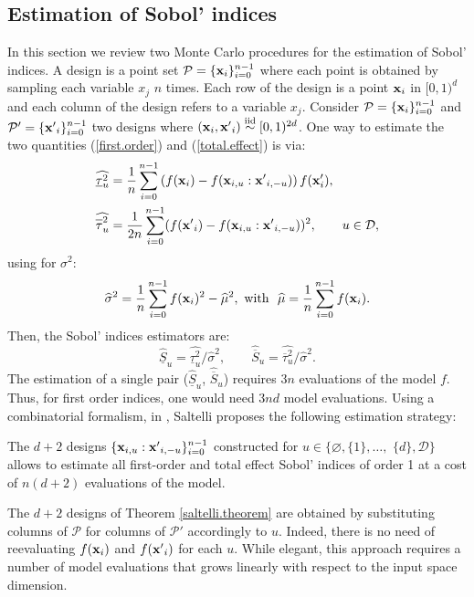 \subsection{Estimation of Sobol' indices}
\label{sec:2.2}
In this section we review two Monte Carlo procedures for the estimation of Sobol' indices. A design is a point set $\mathcal{P}=\{\boldsymbol{\mathbf{x}}_i\}_{i=0}^{n-1}$ where each point is obtained by sampling each variable $x_j$ $n$ times. Each row of the design is a point $\boldsymbol{\mathbf{x}}_i$ in $[0,1)^d$ and each column of the design refers to a variable $x_j$. Consider $\mathcal{P}=\{\boldsymbol{\mathbf{x}}_i\}_{i=0}^{n-1}$ and $\mathcal{P'}=\{{\boldsymbol{\mathbf{x}}'}_i\}_{i=0}^{n-1}$ two designs where $(\boldsymbol{\mathbf{x}}_i,{\boldsymbol{\mathbf{x}}'}_i) \stackrel{{\rm iid}}{\sim} [0,1)^{2d}$. One way to estimate the two quantities (\ref{first.order}) and (\ref{total.effect}) is via:
\begin{align}
\label{first.order.est}
\widehat{\underline{\tau}_u^2} &= \frac{1}{n} \sum \limits_{i=0}^{n-1} \left(f(\vx_i)-f(\vx_{i,u}:{\vx'}_{i,-u})\right)f(\vx'_i),\\
\label{total.effect.est}
\widehat{\ov{$\tau$}_u^2} &= \frac{1}{2n} \sum \limits_{i=0}^{n-1} (f({\vx'}_i) - f(\vx_{i,u}:{\vx'}_{i,-u}))^2, \qquad u \in \mathcal{D},
\end{align}
using for $\sigma^2$:
\begin{equation}
 \widehat{\sigma}^2 = \frac{1}{n} \sum \limits_{i=0}^{n-1} f(\vx_i)^2 - \widehat{\mu}^2, \text{ with } \ \widehat{\mu} =  \frac{1}{n} \sum \limits_{i=0}^{n-1} f(\vx_i).
\label{mu.est}
\end{equation}
Then, the Sobol' indices estimators are:
\begin{equation}
\widehat{\underline{S}}_u = \widehat{\underline{\tau}_u^2} / \widehat{\sigma}^2, \qquad
\widehat{\overline{S}}_u = \widehat{\overline{\tau}_u^2} / \widehat{\sigma}^2.
\label{common.sobol.est}
\end{equation}
The estimation of a single pair ($\widehat{\underline{S}}_u$, $\widehat{\overline{S}}_u$) requires $3n$ evaluations of the model $f$. Thus, for first order indices, one would need $3nd$ model evaluations. Using a combinatorial formalism, in \cite{Saltelli}, Saltelli proposes the following estimation strategy:
\begin{theorem}
\label{saltelli.theorem}
The $d+2$ designs $\{\boldsymbol{\mathbf{x}}_{i,u}:{\boldsymbol{\mathbf{x}}'}_{i,-u}\}_{i=0}^{n-1}$ constructed for $u \in \{\varnothing,\{1\},\dots,$ $\{d\},\mathcal{D}\}$ allows to estimate all first-order and total effect Sobol' indices of order 1 at a cost of $n(d+2)$ evaluations of the model.
\end{theorem}
The $d+2$ designs of Theorem \ref{saltelli.theorem} are obtained by substituting columns of $\mathcal{P}$ for columns of $\mathcal{P}'$ accordingly to $u$. Indeed, there is no need of reevaluating $f({\boldsymbol{\mathbf{x}}}_i)$ and $f({\boldsymbol{\mathbf{x}}'}_i)$ for each $u$. While elegant, this approach requires a number of model evaluations that grows linearly with respect to the input space dimension.

